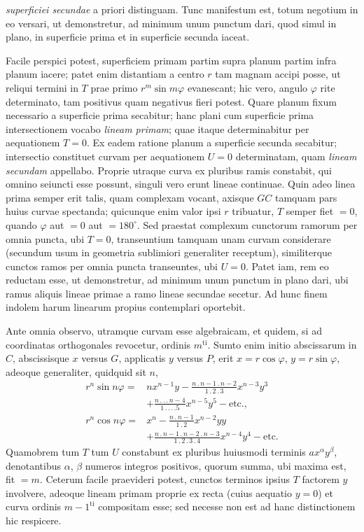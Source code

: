 \textit{superficiei secundae} a priori distinguam. Tunc manifestum est, totum negotium in eo versari, ut demonstretur, ad minimum unum punctum dari, quod simul in plano, in superficie prima et in superficie secunda iaceat.

Facile perspici potest, superficiem primam partim supra planum partim infra planum iacere; patet enim distantiam a centro $r$ tam magnam accipi posse, ut reliqui termini in $T$ prae primo $r^m\sin m\varphi$ evanescant; hic vero, angulo $\varphi$ rite determinato, tam positivus quam negativus fieri potest. Quare planum fixum necessario a superficie prima secabitur; hanc plani cum superficie prima intersectionem vocabo \textit{lineam primam}; quae itaque determinabitur per aequationem $T=0$. Ex eadem ratione planum a superficie secunda secabitur; intersectio constituet curvam per aequationem $U=0$ determinatam, quam \textit{lineam secundam} appellabo. Proprie utraque curva ex pluribus ramis constabit, qui omnino seiuncti esse possunt, singuli vero erunt lineae continuae. Quin adeo linea prima semper erit talis, quam complexam vocant, axisque $GC$ tamquam pars huius curvae spectanda; quicunque enim valor ipsi $r$ tribuatur, $T$ semper fiet $=0$, quando $\varphi$ aut $=0$ aut $=180^{\circ}$. Sed praestat complexum cunctorum ramorum per omnia puncta, ubi $T=0$, transeuntium tamquam unam curvam considerare (secundum usum in geometria sublimiori generaliter receptum), similiterque cunctos ramos per omnia puncta transeuntes, ubi $U=0$. Patet iam, rem eo reductam esse, ut demonstretur, ad minimum unum punctum in plano dari, ubi ramus aliquis lineae primae a ramo lineae secundae secetur. Ad hunc finem indolem harum linearum propius contemplari oportebit.

Ante omnia observo, utramque curvam esse algebraicam, et quidem, si ad coordinatas orthogonales revocetur, ordinis $m^{\mathrm{ti}}$. Sumto enim initio abscissarum in $C$, abscissisque $x$ versus $G$, applicatis $y$ versus $P$, erit $x=r\cos\varphi$, $y=r\sin\varphi$, adeoque generaliter, quidquid sit $n$,
\[
\begin{aligned}
r^n\sin n\varphi={}&nx^{n-1}y-\frac{n\mathbin{.}n-1\mathbin{.}n-2}{1\mathbin{.}2\mathbin{.}3}x^{n-3}y^3\\
&+\frac{n\mathbin{.}\mathbin{.}\mathbin{.}n-4}{1\mathbin{.}\mathbin{.}\mathbin{.}\mathbin{.}5}x^{n-5}y^5-\text{etc.},\\
r^n\cos n\varphi={}&x^n-\frac{n\mathbin{.}n-1}{1\mathbin{.}2}x^{n-2}yy\\
&+\frac{n\mathbin{.}n-1\mathbin{.}n-2\mathbin{.}n-3}{1\mathbin{.}2\mathbin{.}3\mathbin{.}4}x^{n-4}y^4-\text{etc.}
\end{aligned}
\]
Quamobrem tum $T$ tum $U$ constabunt ex pluribus huiusmodi terminis $ax^{\alpha}y^{\beta}$,
denotantibus $\alpha$, $\beta$ numeros integros positivos, quorum summa, ubi maxima est, fit $=m$. Ceterum facile praevideri potest, cunctos terminos ipsius $T$ factorem $y$ involvere, adeoque lineam primam proprie ex recta (cuius aequatio $y=0$) et curva ordinis $m-1^{\mathrm{ti}}$ compositam esse; sed necesse non est ad hanc distinctionem hic respicere.

